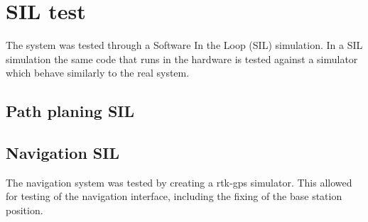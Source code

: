\chapter{SIL test}
The system was tested through a Software In the Loop (SIL) simulation. In a SIL simulation the same code that runs in the hardware is tested against a simulator which behave similarly to the real system.

\section{Path planing SIL}

\section{Navigation SIL}
The navigation system was tested by creating a \gls{rtk-gps} simulator. This allowed for testing of the navigation interface, including the fixing of the base station position.